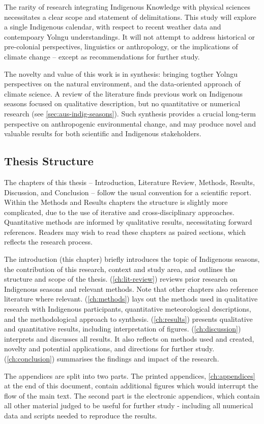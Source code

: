 The rarity of research integrating Indigenous Knowledge with physical sciences
necessitates a clear scope and statement of delimitations.  This study will
explore a single Indigenous calendar, with respect to recent weather data
and contempoary Yolngu understandings.  It will not attempt to address historical
or pre-colonial perspectives, linguistics or anthropology, or the implications
of climate change -- except as recommendations for further study.

The novelty and value of this work is in synthesis: bringing
togther Yolngu perspectives on the natural environment, and the
data-oriented approach of climate science.  A review of the literature
finds previous work on Indigenous seasons focused on qualitative description, but
no quantitative or numerical research (see \cref{sec:aus-indig-seasons}).
Such synthesis provides a crucial long-term perspective on
anthropogenic environmental change, and may produce novel and valuable
results for both scientific and Indigenous stakeholders.



\subsection*{Thesis Structure}

The chapters of this thesis -- Introduction, Literature Review, Methods,
Results, Discussion, and Conclusion -- follow the usual convention for
a scientific report.  Within the Methods and Results chapters
the structure is slightly more complicated, due to the use of iterative and
cross-disciplinary approaches.  Quantitative methods are informed by
qualitative results, necessitating forward references.  Readers may wish
to read these chapters as paired sections, which reflects the research
process.

The introduction (this chapter) briefly introduces the topic of
Indigenous seasons, the contribution of this research, context and
study area, and outlines the structure and scope of the thesis.
 (\cref{ch:lit-review}) reviews prior research
on Indigenous seasons and relevant methods.  Note that other chapters
also reference literature where relevant.
 (\cref{ch:methods}) lays out the methods used in
qualitative research with Indigenous participants, quantitative meteorological
descriptions, and the methodological approach to synthesis.
 (\cref{ch:results}) presents qualitative and
quantitative results, including interpretation of figures.
 (\cref{ch:discussion}) interprets and discusses
all results.  It also reflects on methods used and created, novelty and
potential applications, and directions for further study.
 (\cref{ch:conclusion}) summarises the findings
and impact of the research.

The appendices are split into two parts.  The printed appendices,
\cref{ch:appendices} at the end of this document, contain additional figures
which would interrupt the flow of the main text.  The second part
is the electronic appendices, which contain all other material judged to
be useful for further study - including all numerical data and scripts
needed to reproduce the results.

